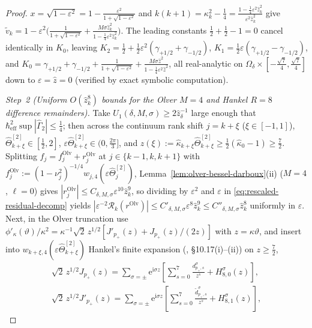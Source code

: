 \documentclass[11pt]{article}
\theoremstyle{definition}
\theoremstyle{remark}
\newcommand{\ii}{\mathrm{i}}
\newcommand{\cR}{\mathcal{R}}
\newcommand{\heff}{\hbar_{\mathrm{eff}}}
\renewcommand{\_}{\oldunderscore\penalty0\hskip0pt\relax}
\begin{document}
\begin{proof}
  $x=\sqrt{1-\varepsilon^2}=1-\frac{\varepsilon^2}{1+\sqrt{1-\varepsilon^2}}$ and
  $k(k+1)=\kappa_k^2-\frac14=\frac{1-\frac14\varepsilon^2\hat{z}_k^2}{\varepsilon^2\hat{z}_k^2}$ give
  $\tilde{v}_k=1-\varepsilon^2\bigl(\frac{1}{1+\sqrt{1-\varepsilon^2}}+\frac{M\sigma\hat{z}_k^2}{1-\frac14\varepsilon^2\hat{z}_k^2}\bigr)$.
  The leading constants $\frac12+\frac12-1=0$ cancel identically in $K_0$, leaving
  $K_2=\frac12+\frac12\varepsilon^2(\gamma_{+1/2}+\gamma_{-1/2})$, $K_1=\frac12\varepsilon(\gamma_{+1/2}-\gamma_{-1/2})$, and
  $K_0=\gamma_{+1/2}+\gamma_{-1/2}+\frac{1}{1+\sqrt{1-\varepsilon^2}}+\frac{M\sigma\hat{z}^2}{1-\frac14\varepsilon^2\hat{z}^2}$,
  all real-analytic on $\Omega_\delta\times[-\frac{\sqrt{7}}{4},\frac{\sqrt{7}}{4}]$ down to $\varepsilon=\hat{z}=0$ (verified
  by exact symbolic computation).

\emph{Step~2 (Uniform $O(\hat{z}_k^8)$ bounds for the Olver $M=4$ and Hankel $R=8$ difference remainders).}
Take $U_1(\delta,M,\sigma)\ge 2\hat{z}_\delta^{-1}$ large enough that $\heff^2\sup|\widehat{\Gamma}_2|\le\frac14$; then across
  the continuum rank shift $j=k+\xi$ ($\xi\in[-1,1]$), $\widehat{\Theta}_{k+\xi}^{[2]}\in[\frac12,2]$,
  $\varepsilon\widehat{\Theta}_{k+\xi}^{[2]}\in(0,\frac{2\pi}{3}]$, and
  $z(\xi):=\hat{\kappa}_{k+\xi}\widehat{\Theta}_{k+\xi}^{[2]}\ge\frac12(\hat{\kappa}_0-1)\ge\frac72$. Splitting
  $f_j=f_j^{\mathrm{Olv}}+r_j^{\mathrm{Olv}}$ at $j\in\{k-1,k,k+1\}$ with
  $f_j^{\mathrm{Olv}}:=(1-\nu_j^2)^{-1/4}w_{j,4}(\varepsilon\widehat{\Theta}_j^{[2]})$, Lemma~\ref{lem:olver-bessel-darboux}(ii)
  ($M=4$, $\ell=0$) gives $|r_j^{\mathrm{Olv}}|\le C_{\delta,M,\sigma}\varepsilon^{10}\hat{z}_k^9$, so dividing by
  $\varepsilon^2$ and $\varepsilon$ in \eqref{eq:rescaled-residual-decomp} yields $|\varepsilon^{-2}\cR_k(r^{\mathrm{Olv}})|\le
  C'_{\delta,M,\sigma}\varepsilon^8\hat{z}_k^9\le C''_{\delta,M,\sigma}\hat{z}_k^8$ uniformly in $\varepsilon$. Next, in the
  Olver truncation use $\phi'_\kappa(\vartheta)/\kappa^2=\kappa^{-1}\sqrt{2}\,z^{1/2}[J'_{p_+}(z)+J_{p_+}(z)/(2z)]$ with
  $z=\kappa\vartheta$, and insert into $w_{k+\xi,4}(\varepsilon\widehat{\Theta}_{k+\xi}^{[2]})$ Hankel's finite expansion
  (\cite{DLMF}, \S10.17(i)--(ii)) on $z\ge\frac72$,
\begin{equation}
  \begin{gathered}
  \sqrt{2}\,z^{1/2}J_{p_+}(z) = \sum_{\sigma=\pm}\mathrm{e}^{\ii\sigma z}\!\left[\sum_{s=0}^7\frac{d_{p_+,s}^\sigma}{z^s}+H_{8,0}^\sigma(z)\right],\\
  \sqrt{2}\,z^{1/2}J'_{p_+}(z) = \sum_{\sigma=\pm}\mathrm{e}^{\ii\sigma z}\!\left[\sum_{s=0}^7\frac{\tilde{d}_{p_+,s}^\sigma}{z^s}+H_{8,1}^\sigma(z)\right],

\end{gathered}
\end{equation}
\end{proof}
\end{document}
